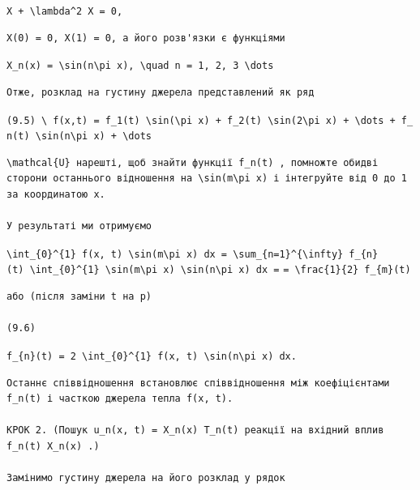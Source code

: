 \documentclass[
  ukrainian,
]{article}
\begin{document}
\texttt{X\textquotesingle{}\textquotesingle{}\ +\ \textbackslash{}lambda\^{}2\ X\ =\ 0,}

\begin{verbatim}
X(0) = 0, X(1) = 0, а його розв'язки є функціями
\end{verbatim}

\texttt{X\_n(x)\ =\ \textbackslash{}sin(n\textbackslash{}pi\ x),\ \textbackslash{}quad\ n\ =\ 1,\ 2,\ 3\ \textbackslash{}dots}

\begin{verbatim}
Отже, розклад на густину джерела представлений як ряд
\end{verbatim}

\texttt{(9.5)\ \textbackslash{}\ f(x,t)\ =\ f\_1(t)\ \textbackslash{}sin(\textbackslash{}pi\ x)\ +\ f\_2(t)\ \textbackslash{}sin(2\textbackslash{}pi\ x)\ +\ \textbackslash{}dots\ +\ f\_n(t)\ \textbackslash{}sin(n\textbackslash{}pi\ x)\ +\ \textbackslash{}dots}

\begin{verbatim}
\mathcal{U} нарешті, щоб знайти функції f_n(t) , помножте обидві сторони останнього відношення на \sin(m\pi x) і інтегруйте від 0 до 1 за координатою x.

У результаті ми отримуємо
\end{verbatim}

\texttt{\textbackslash{}int\_\{0\}\^{}\{1\}\ f(x,\ t)\ \textbackslash{}sin(m\textbackslash{}pi\ x)\ dx\ =\ \textbackslash{}sum\_\{n=1\}\^{}\{\textbackslash{}infty\}\ f\_\{n\}(t)\ \textbackslash{}int\_\{0\}\^{}\{1\}\ \textbackslash{}sin(m\textbackslash{}pi\ x)\ \textbackslash{}sin(n\textbackslash{}pi\ x)\ dx\ =}
\texttt{=\ \textbackslash{}frac\{1\}\{2\}\ f\_\{m\}(t)}

\begin{verbatim}
або (після заміни t на p)

(9.6)
\end{verbatim}

\texttt{f\_\{n\}(t)\ =\ 2\ \textbackslash{}int\_\{0\}\^{}\{1\}\ f(x,\ t)\ \textbackslash{}sin(n\textbackslash{}pi\ x)\ dx.}

\begin{verbatim}
Останнє співвідношення встановлює співвідношення між коефіцієнтами f_n(t) і часткою джерела тепла f(x, t).

КРОК 2. (Пошук u_n(x, t) = X_n(x) T_n(t) реакції на вхідний вплив f_n(t) X_n(x) .)

Замінимо густину джерела на його розклад у рядок
\end{verbatim}
\end{document}
